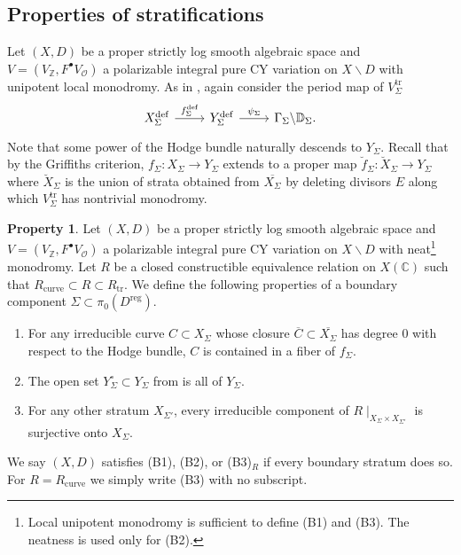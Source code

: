 \documentclass{amsart}
\newcommand{\bs}{\backslash}
\newcommand{\ol}{\overline}
\theoremstyle{definition}
\newtheorem{property}[theorem]{Property}
\theoremstyle{remark}
\def\bD{\mathbb{D}}
\def\bZ{\mathbb{Z}}
\def\bC{\mathbb{C}}
\def\cO{\mathcal{O}}
\def\define{\mathrm{def}}
\def\reg{\mathrm{reg}}
\def\trans{\mathrm{tr}}
\renewcommand{\bar}[1]{\ol{#1}}
\numberwithin{equation}{section}
\begin{document}
\subsection{Properties of stratifications}\label{subsect:good strat}
Let $(X,D)$ be a proper strictly log smooth algebraic space and $V=(V_\bZ,F^\bullet V_\cO)$ a polarizable integral pure CY variation on $X\bs D$ with unipotent local monodromy.  As in , again consider the period map of $V^\trans_\Sigma$ 
\[\begin{tikzcd}
X_\Sigma^\define\ar[r,"f_\Sigma^\define"]&Y_\Sigma^\define\ar[r,"\psi_\Sigma"]&\Gamma_\Sigma\backslash \bD_\Sigma.
\end{tikzcd}\]
Note that some power of the Hodge bundle naturally descends to $Y_\Sigma$.  Recall that by the Griffiths criterion, $f_\Sigma:X_\Sigma\to Y_\Sigma$  extends to a proper map $\breve f_\Sigma:\breve X_\Sigma\to Y_\Sigma$ where $\breve X_\Sigma$ is the union of strata obtained from $\overline{X_\Sigma}$ by deleting divisors $E$ along which $V^\trans_\Sigma$ has nontrivial monodromy. 
\begin{property}\label{defn:clarified}Let $(X,D)$ be a proper strictly log smooth algebraic space and $V=(V_\bZ,F^\bullet V_\cO)$ a polarizable integral pure CY variation on $X\bs D$ with  neat\footnote{Local unipotent monodromy is sufficient to define (B1) and (B3). The neatness is used only for (B2).} 
monodromy. Let $R$ be a closed constructible equivalence relation on $X(\bC)$ such that $R_\mathrm{curve}\subset R\subset R_\trans$. We define the following properties of a boundary component $\Sigma\subset \pi_0(D^\reg)$. 
\begin{enumerate}
\item[(B1)\>\>\>]\label{b1} For any irreducible curve $C\subset X_\Sigma$ whose closure $\bar C\subset\overline{X_\Sigma}$ has degree 0 with respect to the Hodge bundle, $C$ is contained in a fiber of $f_\Sigma$.  
\item[(B2)\>\>\>]\label{b2} The open set $Y^\circ_\Sigma\subset Y_\Sigma$ from  is all of $Y_\Sigma$.
\item[(B3)$_R$]\label{b3} For any other stratum
 $X_{\Sigma'}$, every irreducible component of $R\mid_{X_{\Sigma}\times X_{\Sigma'}}$ is surjective onto $X_\Sigma$.
\end{enumerate}
We say $(X,D)$ satisfies (B1), (B2), or (B3)$_R$ if every boundary stratum does so. For $R=R_{\mathrm{curve}}$
we simply write (B3) with no subscript.
\end{property}
\end{document}
